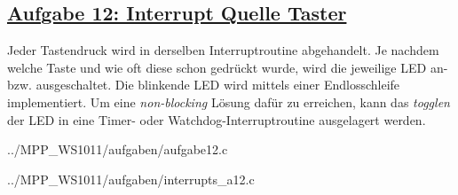 \subsection*
{\href{http://cst.mi.fu-berlin.de/intern/19606-P-MPP/Aufgaben/040401.html}
{Aufgabe 12: Interrupt Quelle Taster}}
Jeder Tastendruck wird in derselben Interruptroutine abgehandelt. Je nachdem welche Taste und wie oft diese schon gedrückt wurde, wird die jeweilige LED an- bzw. ausgeschaltet. Die blinkende LED wird mittels einer Endlosschleife implementiert.
Um eine \textit{non-blocking} Lösung dafür zu erreichen, kann das \textit{togglen} der LED in eine Timer- oder Watchdog-Interruptroutine ausgelagert werden.

{../MPP_WS1011/aufgaben/aufgabe12.c}


{../MPP_WS1011/aufgaben/interrupts_a12.c}
